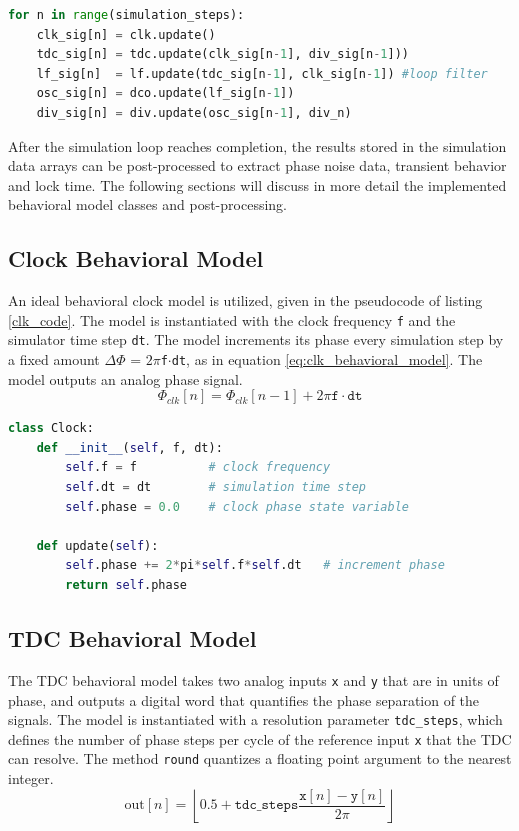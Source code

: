 \begin{lstlisting}[language={Python}, caption={PLL simulation loop Python pseudocode}, label={sim_code}]
for n in range(simulation_steps):
    clk_sig[n] = clk.update()
    tdc_sig[n] = tdc.update(clk_sig[n-1], div_sig[n-1]))
    lf_sig[n]  = lf.update(tdc_sig[n-1], clk_sig[n-1]) #loop filter
    osc_sig[n] = dco.update(lf_sig[n-1])
    div_sig[n] = div.update(osc_sig[n-1], div_n)
    \end{lstlisting}
After the simulation loop reaches completion, the results stored in the simulation data arrays can be post-processed to extract phase noise data, transient behavior and lock time. The following sections will discuss in more detail the implemented behavioral model classes and post-processing.

\subsection{Clock Behavioral Model}
An ideal behavioral clock model is utilized, given in the pseudocode of listing \ref{clk_code}. The model is instantiated with the clock frequency \texttt{f} and the simulator time step \texttt{dt}. The model increments its phase every simulation step by a fixed amount $\Delta \Phi$ = $2\pi$\texttt{f}$\cdot$\texttt{dt}, as in equation \ref{eq:clk_behavioral_model}. The model outputs an analog phase signal.
\begin{equation}\label{eq:clk_behavioral_model}
	\Phi_{clk}[n] = \Phi_{clk}[n-1] + 2\pi\mathtt{f}\cdot\mathtt{dt}
\end{equation}

\begin{lstlisting}[language={Python}, caption={Ideal clock behavioral model Python pseudocode.}, label={clk_code}]
class Clock:
	def __init__(self, f, dt):
		self.f = f 			# clock frequency
		self.dt = dt 		# simulation time step
		self.phase = 0.0	# clock phase state variable

	def update(self):
		self.phase += 2*pi*self.f*self.dt 	# increment phase
		return self.phase
    \end{lstlisting}

\subsection{TDC Behavioral Model}
The TDC behavioral model takes two analog inputs \texttt{x} and \texttt{y} that are in units of phase, and outputs a digital word that quantifies the phase separation of the signals. The model is instantiated with a resolution parameter \texttt{tdc\_steps}, which defines the number of phase steps per cycle of the reference input \texttt{x} that the TDC can resolve. The method \texttt{round} quantizes a floating point argument to the nearest integer.
\begin{equation}
	\text{out}[n] = \left\lfloor0.5 + \mathtt{tdc\_steps}\frac{\mathtt{x}[n]-\mathtt{y}[n]}{2\pi} \right\rfloor
\end{equation}

